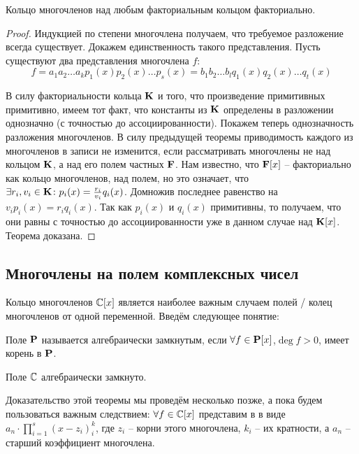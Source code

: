 \begin{theorem}
  Кольцо многочленов над любым факториальным кольцом факториально.
\end{theorem}
\begin{proof}
  Индукцией по степени многочлена получаем, что требуемое разложение всегда существует. Докажем единственность такого представления. Пусть существуют два представления многочлена $f$:
  $$f=a_1a_2\dots a_k p_1(x)p_2(x)\dots p_s(x)=b_1b_2\dots b_lq_1(x)q_2(x)\dots q_t(x)$$
  
  В силу факториальности кольца $\mathbf{K}$ и того, что произведение примитивных примитивно, имеем тот факт, что константы из $\mathbf{K}$ определены в разложении однозначно (с точностью до ассоциированности). Покажем теперь однозначность разложения многочленов. В силу предыдущей теоремы приводимость каждого из многочленов в записи не изменится, если рассматривать многочлены не над кольцом $\mathbf{K}$, а над его полем частных $\mathbf{F}$. Нам известно, что $\mathbf{F}[x]$ -- факториально как кольцо многочленов, над полем, но это означает, что $\exists r_i,v_i\in\mathbf{K}\colon p_i(x)=\frac{r_i}{v_i}q_i(x)$. Домножив последнее равенство на $v_ip_i(x)=r_iq_i(x)$. Так как $p_i(x)$ и $q_i(x)$ примитивны, то получаем, что они равны с точностью до ассоциированности уже в данном случае над $\mathbf{K}[x]$. Теорема доказана.
\end{proof}

\subsection{Многочлены на полем комплексных чисел}

Кольцо многочленов $\mathbb{C}[x]$ является наиболее важным случаем полей / колец многочленов от одной переменной. Введём следующее понятие:

\begin{df}
  Поле $\mathbf{P}$ называется алгебраически замкнутым, если $\forall f\in\mathbf{P}[x]$,\linebreak $\deg f>0$, имеет корень в $\mathbf{P}$.
\end{df}
\begin{theorem}
  Поле $\mathbb{C}$ алгебраически замкнуто.
\end{theorem}

Доказательство этой теоремы мы проведём несколько позже, а пока будем пользоваться важным следствием: $\forall f\in\mathbb{C}[x]$ представим в в виде $a_n\cdot\prod\limits_{i=1}^s(x-z_i)^k_i$, где $z_i$ -- корни этого многочлена, $k_i$ -- их кратности, а $a_n$ -- старший коэффициент многочлена.


